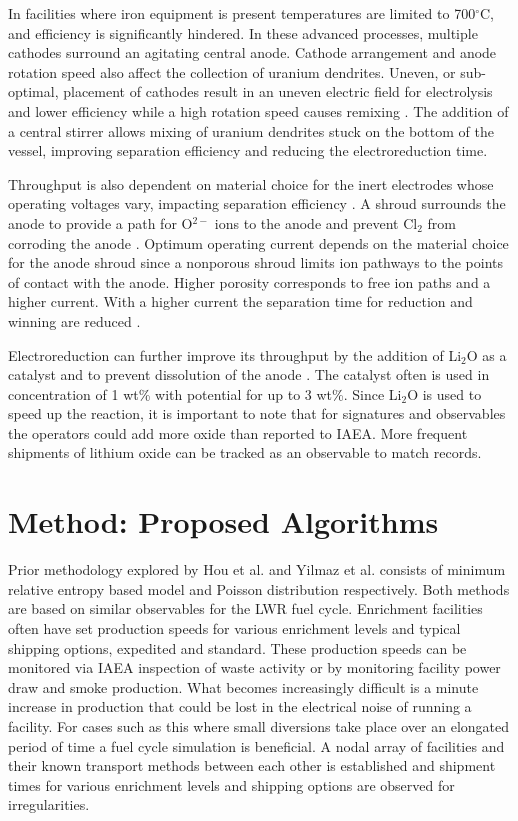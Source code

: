 \documentclass{anstrans}
\begin{document}
In facilities where iron equipment is present temperatures are limited to 700$^{\circ}$C, and efficiency is significantly hindered. In these advanced processes, multiple cathodes surround an agitating central anode. Cathode arrangement and anode rotation speed also affect the collection of uranium dendrites. Uneven, or sub-optimal, placement of cathodes result in an uneven electric field for electrolysis and lower efficiency while a high rotation speed causes remixing \cite{lee_advanced_nodate}. The addition of a central stirrer allows mixing of uranium dendrites stuck on the bottom of the vessel, improving separation efficiency and reducing the electroreduction time. 

Throughput is also dependent on material choice for the inert electrodes whose operating voltages vary, impacting separation efficiency \cite{koyama_development_2012}. A shroud surrounds the anode to provide a path for O$^{2-}$ ions to the anode and prevent Cl$_2$ from corroding the anode \cite{kim_development_2013,choi_electrochemical_2015}. Optimum operating current depends on the material choice for the anode shroud since a nonporous shroud limits ion pathways to the points of contact with the anode. Higher porosity corresponds to free ion paths and a higher current. With a higher current the separation time for reduction and winning are reduced \cite{choi_electrochemical_2015}. 


Electroreduction can further improve its throughput by the addition of Li$_2$O as a catalyst and to prevent dissolution of the anode \cite{choi_electrochemical_2015}. The catalyst often is used in concentration of 1 wt\% with potential for up to 3 wt\%. Since Li$_2$O is used to speed up the reaction, it is important to note that for signatures and observables the operators could add more oxide than reported to IAEA. More frequent shipments of lithium oxide can be tracked as an observable to match records.
\section{Method: Proposed Algorithms}
Prior methodology explored by Hou et al. and Yilmaz et al. \cite{Hou_2016,Yilmaz_2016} consists of minimum relative entropy based model and Poisson distribution respectively. Both methods are based on similar observables for the LWR fuel cycle. Enrichment facilities often have set production speeds for various enrichment levels and typical shipping options, expedited and standard. These production speeds can be monitored via IAEA inspection of waste activity or by monitoring facility power draw and smoke production. What becomes increasingly difficult is a minute increase in production that could be lost in the electrical noise of running a facility. For cases such as this where small diversions take place over an elongated period of time a fuel cycle simulation is beneficial. A nodal array of facilities and their known transport methods between each other is established and shipment times for various enrichment levels and shipping options are observed for irregularities. 
\end{document}
